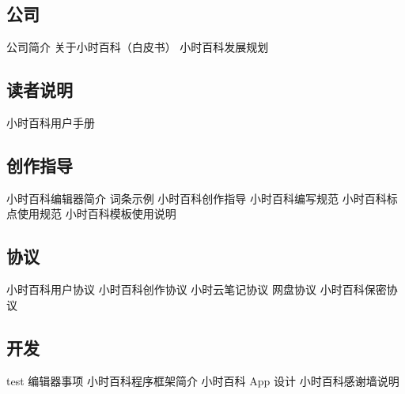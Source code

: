 
\subsection{公司}
公司简介
关于小时百科（白皮书）
小时百科发展规划

\subsection{读者说明}
小时百科用户手册

\subsection{创作指导}
小时百科编辑器简介
词条示例
小时百科创作指导
小时百科编写规范
小时百科标点使用规范
小时百科模板使用说明

\subsection{协议}
小时百科用户协议
小时百科创作协议
小时云笔记协议
网盘协议
小时百科保密协议

\subsection{开发}
test
编辑器事项
小时百科程序框架简介
小时百科 App 设计
小时百科感谢墙说明
